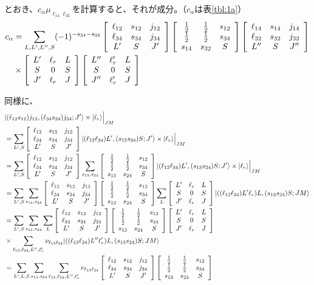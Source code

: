 \documentclass[a4j]{jarticle}
\def\ket{\rangle}
\def\half#1{\text{${#1\over 2}$}}
\newcommand{\U}[9]{\left[\begin{array}{ccc}#1&#2&#3\\#4&#5&#6\\#7&#8&#9\\ \end{array}\right]}
\begin{document}
とおき、$c_\alpha \mu_{\ell_{14}\ell_{32}}$を計算すると、それが成分。（$c_\alpha$は表\ref{tbl:1a}）
\begin{align}
c_\alpha&=
\sum_{L,L',L'',S}
(-1)^{-s_{34}-s_{32}}
\U{\ell_{12}}{s_{12}}{j_{12}}{\ell_{34}}{s_{34}}{j_{34}}{L'}{S}{J'}
\U{\half1}{\half1}{s_{12}}{\half1}{\half1}{s_{34}}{s_{14}}{s_{32}}{S}
\U{\ell_{14}}{s_{14}}{j_{14}}{\ell_{32}}{s_{32}}{j_{32}}{L''}{S}{J''}
\nonumber\\
&\times
\U{L'}{\ell_r}{L}{S}{0}{S}{J'}{\ell_r}{J}
\U{L''}{\ell_r'}{L}{S}{0}{S}{J''}{\ell_r'}{J}
\end{align}

同様に、
\begin{align}
\lefteqn{|(\ell_{12}s_{12})j_{12},(\ell_{34}s_{34})j_{34};J'\ket \times|\ell_r\ket \Big|_{JM}}&\\
&=
\sum_{L',S}
\U{\ell_{12}}{s_{12}}{j_{12}}{\ell_{34}}{s_{34}}{j_{34}}{L'}{S}{J'}
|(\ell_{12}\ell_{34})L',(s_{12}s_{34})S;J'\ket\times|\ell_r\ket \Big|_{JM}
\\
&=\sum_{L',S}
\U{\ell_{12}}{s_{12}}{j_{12}}{\ell_{34}}{s_{34}}{j_{34}}{L'}{S}{J'}
\sum_{s_{13},s_{24}}
\U{\half1}{\half1}{s_{12}}{\half1}{\half1}{s_{34}}{s_{13}}{s_{24}}{S}
|(\ell_{12}\ell_{34})L',(s_{13}s_{24})S;J'\ket\times|\ell_r\ket \Big|_{JM}
%
%
\\
&=
\sum_{L',S}
\sum_{s_{13},s_{24}}
\U{\ell_{12}}{s_{12}}{j_{12}}{\ell_{34}}{s_{34}}{j_{34}}{L'}{S}{J'}
\U{\half1}{\half1}{s_{12}}{\half1}{\half1}{s_{34}}{s_{13}}{s_{24}}{S}
\sum_{L}
\U{L'}{\ell_r}{L}{S}{0}{S}{J'}{\ell_r}{J}
|((\ell_{12}\ell_{34})L'\ell_r)L,(s_{13}s_{24})S;JM\ket
\\
&=
\sum_{L',S}
\sum_{s_{13},s_{24}}
\sum_{L}
\U{\ell_{12}}{s_{12}}{j_{12}}{\ell_{34}}{s_{34}}{j_{34}}{L'}{S}{J'}
\U{\half1}{\half1}{s_{12}}{\half1}{\half1}{s_{34}}{s_{13}}{s_{24}}{S}
\U{L'}{\ell_r}{L}{S}{0}{S}{J'}{\ell_r}{J}
\nonumber\\
&\times 
\sum_{\ell_{13},\ell_{24},L'',\ell_r'}
\nu_{\ell_{13}\ell_{24}} |((\ell_{13}\ell_{24})L''\ell_r')L,(s_{13}s_{24})S;JM\ket
\\
&=
\sum_{L',L,S}
\sum_{s_{13},s_{24}}
\sum_{\ell_{13},\ell_{24},L'',\ell_r'}
\nu_{\ell_{13}\ell_{24}}
\U{\ell_{12}}{s_{12}}{j_{12}}{\ell_{34}}{s_{34}}{j_{34}}{L'}{S}{J'}
\U{\half1}{\half1}{s_{12}}{\half1}{\half1}{s_{34}}{s_{13}}{s_{24}}{S}

\end{align}
\end{document}
